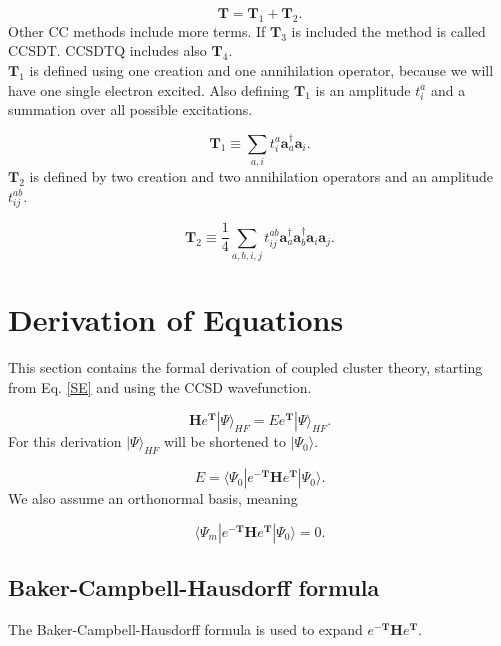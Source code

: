 \documentclass[a4paper,norsk,11pt,twoside]{report}
\begin{document}
\begin{equation}
\textbf{T} = \textbf{T}_1 + \textbf{T}_2 .
\end{equation}
Other CC methods include more terms. If $\textbf{T}_3$ is included the method is called CCSDT. CCSDTQ includes also $\textbf{T}_4$. \\

$\textbf{T}_1$ is defined using one creation and one annihilation operator, because we will have one single electron excited. Also defining $\textbf{T}_1$ is an amplitude $t_i^a$ and a summation over all possible excitations.  

\begin{equation}
\textbf{T}_1 \equiv \sum_{a,i} t_i^a \textbf{a}^{\dag}_a \textbf{a}_i . \label{t1defi}
\end{equation}
$\textbf{T}_2$ is defined by two creation and two annihilation operators and an amplitude $t_{ij}^{ab}$.

\begin{equation}
\textbf{T}_2 \equiv \frac{1}{4} \sum_{a,b,i,j} t_{ij}^{ab} \textbf{a}^{\dag}_a \textbf{a}^{\dag}_b \textbf{a}_i \textbf{a}_j . \label{t2defi}
\end{equation}

\section{Derivation of Equations}
This section contains the formal derivation of coupled cluster theory, starting from Eq. \eqref{SE} and using the CCSD wavefunction. 

\begin{equation}
\textbf{H} e^{\textbf{T}} |\Psi \rangle_{HF} = E e^{\textbf{T}} |\Psi \rangle_{HF} .
\end{equation}
For this derivation $|\Psi \rangle_{HF}$ will be shortened to $|\Psi_0 \rangle$. 

\begin{equation}
E = \langle \Psi_0 |e^{-\textbf{T}} \textbf{H} e^{\textbf{T}} |\Psi_0 \rangle .
\end{equation}
We also assume an orthonormal basis, meaning

\begin{equation}
\langle \Psi_m |e^{-\textbf{T}} \textbf{H} e^{\textbf{T}} |\Psi_0 \rangle = 0 .
\end{equation}

\subsection{Baker-Campbell-Hausdorff formula}
The Baker-Campbell-Hausdorff formula is used to expand $e^{-\textbf{T}} \textbf{H} e^{\textbf{T}}$.
\end{document}
